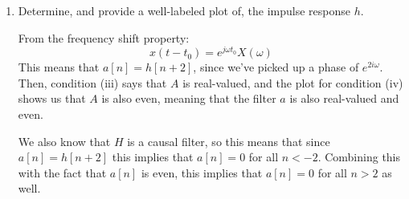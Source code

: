 \documentclass[10pt]{article}
\begin{document}
	\begin{enumerate}[label=\alph*)]
		\item Determine, and provide a well-labeled plot of, the impulse response \( h \). 

			\begin{solution}
				From the frequency shift property:
				\[
				x(t - t_0) = e^{j \omega t_0}X(\omega)
				\] 
				This means that \( a[n] = h[n + 2] \), since we've picked up a phase of \( e^{2 i \omega} \). Then, 
				condition (iii) says that \( A \) is real-valued, and the plot for condition (iv) shows us 
				that  \( A \) is also even, meaning that the filter \( a \) is also real-valued and 
				even. 

				We also know that \( H \) is a causal filter, so this means that since \( a[n] = h[n + 2] \) 
				this implies that \( a[n] = 0 \) for all \( n < -2 \). Combining this with the fact that \( a[n] \) 
				is even, this implies that \( a[n] = 0\) for all \( n > 2 \) as well. 


\end{solution}
\end{enumerate}
\end{document}
